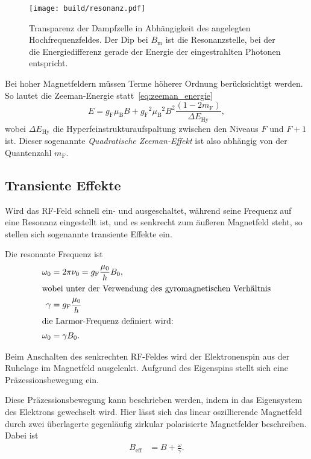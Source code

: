 \begin{figure}[ht]
  \centering
  \texttt{[image: build/resonanz.pdf]}
  \caption{%
    Transparenz der Dampfzelle in Abhängigkeit des angelegten
    Hochfrequenzfeldes.\cite{anleitung}
    Der Dip bei $B_\text{m}$ ist die Resonanzstelle, bei der die
    Energiedifferenz gerade der Energie der eingestrahlten Photonen entspricht.
  }%
  \label{fig:resonanz}
\end{figure}


Bei hoher Magnetfeldern müssen Terme höherer Ordnung berücksichtigt werden.
So lautet die Zeeman-Energie statt~\eqref{eq:zeeman_energie}
\begin{equation}
	\label{eq:quad_zee}
  E = g_\text{F} \mu_\text{B} B + {g_\text{F}}^2 {\mu_\text{B}}^2 {B}^2 \frac{\left(1
  - 2 m_\text{F} \right)}{\Delta E_\text{Hy}},
\end{equation}
wobei $\Delta E_\text{Hy}$ die Hyperfeinstrukturaufspaltung zwischen den
Niveaus $F$ und $F + 1$ ist.
Dieser sogenannte \textit{Quadratische Zeeman-Effekt} ist also abhängig von
der Quantenzahl $m_\text{F}$.


\subsection{Transiente Effekte}%
\label{sub:transiente_effekte}

Wird das RF-Feld schnell ein- und ausgeschaltet, während seine Frequenz auf eine
Resonanz eingestellt ist, und es senkrecht zum äußeren Magnetfeld steht,
so stellen sich sogenannte transiente Effekte ein.

Die resonante Frequenz ist
\begin{align}
  \omega_0 &= 2 \pi \nu_0 = g_\text{F} \frac{\mu_0}{h} B_0, \\
  \intertext{wobei unter der Verwendung des gyromagnetischen Verhältnis}
  \gamma &= g_\text{F} \frac{\mu_0}{h} \\
  \intertext{die Larmor-Frequenz definiert wird:}
  \omega_0 &= \gamma B_0.
\end{align}

Beim Anschalten des senkrechten RF-Feldes wird der Elektronenspin aus der
Ruhelage im Magnetfeld ausgelenkt.
Aufgrund des Eigenspins stellt sich eine Präzessionsbewegung ein.

Diese Präzessionsbewegung kann beschrieben werden, indem in das Eigensystem des
Elektrons gewechselt wird.
Hier lässt sich das linear oszillierende Magnetfeld durch zwei überlagerte
gegenläufig zirkular polarisierte Magnetfelder beschreiben.
Dabei ist
\begin{align}
  B_\text{eff} &= B + \frac{\omega}{\gamma}.
\end{align}

